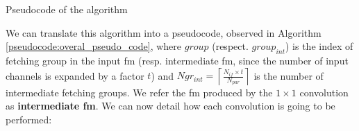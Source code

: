\begin{algorithm}
    \centering
    \begin{algorithmic}
        \EndFor
    \end{algorithmic}
    \caption{Pseudocode of the algorithm}
    \label{pseudocode:overal_pseudo_code}
\end{algorithm}
%
We can translate this algorithm into a pseudocode, observed in Algorithm \ref{pseudocode:overal_pseudo_code}, where $group$ (respect. $group_{int}$) is the index of fetching group in the input \acrshort{fm} (resp. intermediate \acrshort{fm}, since the number of input channels is expanded by a factor $t$) and $Ngr_{int} = \left\lceil \frac{N_{if} \times t}{N_{par}} \right\rceil$ is the number of intermediate fetching groups. We refer the \acrshort{fm} produced by the $1 \times 1$ convolution as \textbf{intermediate  \acrshort{fm}}. We can now detail how each convolution is going to be performed:
%
